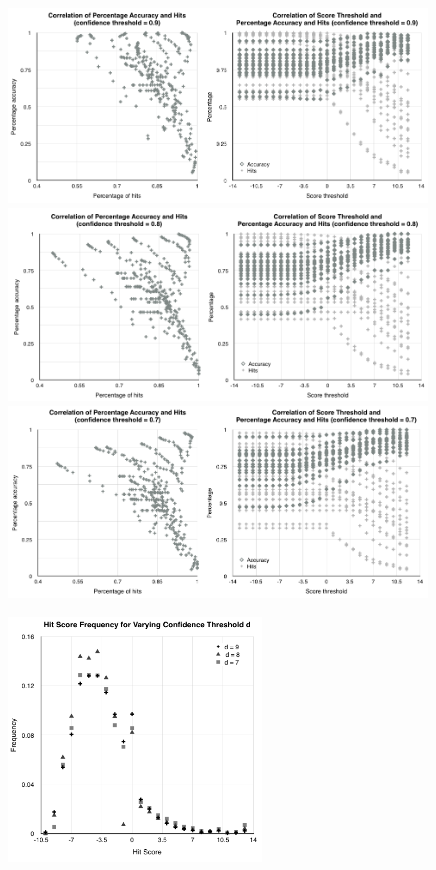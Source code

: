 \documentclass{article}
\begin{document}
\begin{figure}[tbp]
\begin{center}
\caption{}
  \includegraphics[width=0.99\textwidth]{09}
   \includegraphics[width=0.99\textwidth]{08}
   \includegraphics[width=0.99\textwidth]{07}
\label{figure:big_page}
\end{center}
\end{figure}

\begin{figure}[tbp]
\begin{center}
\caption{}
  \includegraphics[width=0.60\textwidth]{hit-score-freq-1000}
\label{figure:hit_freq}
\end{center}
\end{figure}
\end{document}
